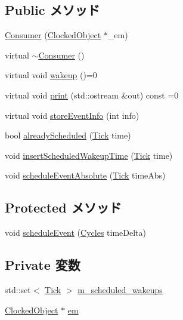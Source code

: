 \subsection*{Public メソッド}
\begin{DoxyCompactItemize}
\item 
\hyperlink{classConsumer_a645ceafe42017acfa86025960f300df1}{Consumer} (\hyperlink{classClockedObject}{ClockedObject} $\ast$\_\-em)
\item 
virtual \hyperlink{classConsumer_afc5a9aad1f27ac3414bc75d841e848ee}{$\sim$Consumer} ()
\item 
virtual void \hyperlink{classConsumer_a623e3e7d1b1c725d70009f7b01a421b9}{wakeup} ()=0
\item 
virtual void \hyperlink{classConsumer_a3ea5f7af5db62cc24f4e40df9ea5c971}{print} (std::ostream \&out) const =0
\item 
virtual void \hyperlink{classConsumer_a6f82fdec6e5674ac2254f16b8fa82afb}{storeEventInfo} (int info)
\item 
bool \hyperlink{classConsumer_a995ed0e67a3f05938c1cb5c8152ac5af}{alreadyScheduled} (\hyperlink{base_2types_8hh_a5c8ed81b7d238c9083e1037ba6d61643}{Tick} time)
\item 
void \hyperlink{classConsumer_a18f41a3442b6485c6e07f2d0440cf659}{insertScheduledWakeupTime} (\hyperlink{base_2types_8hh_a5c8ed81b7d238c9083e1037ba6d61643}{Tick} time)
\item 
void \hyperlink{classConsumer_a0b26d8ce23c3ab271e7a746e57174721}{scheduleEventAbsolute} (\hyperlink{base_2types_8hh_a5c8ed81b7d238c9083e1037ba6d61643}{Tick} timeAbs)
\end{DoxyCompactItemize}
\subsection*{Protected メソッド}
\begin{DoxyCompactItemize}
\item 
void \hyperlink{classConsumer_a5a4c2856f4eb5cd5493f36dfb0675f00}{scheduleEvent} (\hyperlink{classCycles}{Cycles} timeDelta)
\end{DoxyCompactItemize}
\subsection*{Private 変数}
\begin{DoxyCompactItemize}
\item 
std::set$<$ \hyperlink{base_2types_8hh_a5c8ed81b7d238c9083e1037ba6d61643}{Tick} $>$ \hyperlink{classConsumer_a80158caf2e9b370c03daba358a438493}{m\_\-scheduled\_\-wakeups}
\item 
\hyperlink{classClockedObject}{ClockedObject} $\ast$ \hyperlink{classConsumer_a75e14198badfddb1422adb9833fbd275}{em}
\end{DoxyCompactItemize}


